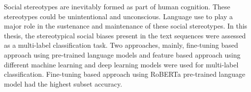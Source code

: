 Social stereotypes are inevitably formed as part of human cognition. These stereotypes could be unintentional and unconscious. Language use to play a major role in the sustenance and maintenance of these social stereotypes. In this thesis, the stereotypical social biases present in the text sequences were assessed as a multi-label classification task. Two approaches, mainly, fine-tuning based approach using pre-trained language models and feature based approach using different machine learning and deep learning models were used for multi-label classification. Fine-tuning based approach using RoBERTa pre-trained language model had the highest subset accuracy. 